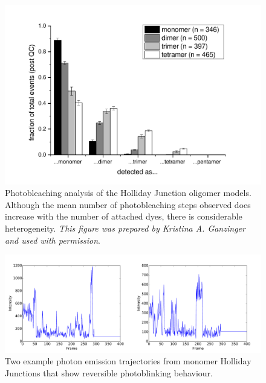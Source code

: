 \begin{figure}
   \begin{center}
      \includegraphics*[width=5in]{sizing/results-holidayjunctions.pdf}
      \caption{Photobleaching analysis of the Holliday Junction oligomer models. Although the mean number of photobleaching steps observed does increase with the number of attached dyes, there is considerable heterogeneity. \emph{This figure was prepared by Kristina A. Ganzinger and used with permission}.}
      \label{fig:photobleaching}
   \end{center}
\end{figure}

\begin{figure}
   \begin{center}
      \includegraphics*[width=5in]{sizing/blinking_trajectories.pdf}
      \caption{Two example photon emission trajectories from monomer Holliday Junctions that show reversible photoblinking behaviour.}
      \label{fig:blinking}
   \end{center}
\end{figure}

